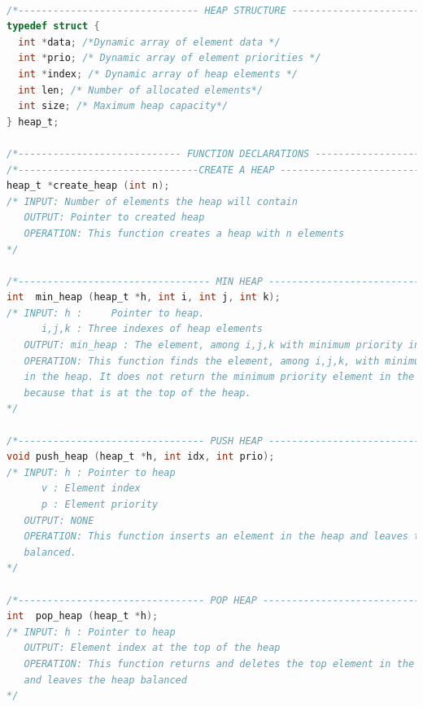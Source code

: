 \documentclass[10pt]{article}
\begin{document}
\begin{lstlisting}[language=C, caption= \textbf{Heap Implementation}]

/*------------------------------- HEAP STRUCTURE ----------------------------*/
typedef struct {
  int *data; /*Dynamic array of element data */
  int *prio; /* Dynamic array of element priorities */
  int *index; /* Dynamic array of heap elements */
  int len; /* Number of allocated elements*/
  int size; /* Maximum heap capacity*/
} heap_t;

/*---------------------------- FUNCTION DECLARATIONS ------------------------*/
/*-------------------------------CREATE A HEAP ------------------------------*/
heap_t *create_heap (int n);
/* INPUT: Number of elements the heap will contain
   OUTPUT: Pointer to created heap
   OPERATION: This function creates a heap with n elements
*/

/*--------------------------------- MIN HEAP --------------------------------*/
int  min_heap (heap_t *h, int i, int j, int k);
/* INPUT: h :     Pointer to heap.
	  i,j,k : Three indexes of heap elements
   OUTPUT: min_heap : The element, among i,j,k with minimum priority in the heap
   OPERATION: This function finds the element, among i,j,k, with minimum priority
   in the heap. It does not return the minimum priority element in the heap,
   because that is at the top of the heap.
*/

/*-------------------------------- PUSH HEAP --------------------------------*/
void push_heap (heap_t *h, int idx, int prio);
/* INPUT: h : Pointer to heap
	  v : Element index
	  p : Element priority
   OUTPUT: NONE
   OPERATION: This function inserts an element in the heap and leaves the heap
   balanced.
*/

/*-------------------------------- POP HEAP ---------------------------------*/
int  pop_heap (heap_t *h);
/* INPUT: h : Pointer to heap
   OUTPUT: Element index at the top of the heap
   OPERATION: This function returns and deletes the top element in the heap
   and leaves the heap balanced
*/
\end{lstlisting}
\end{document}
